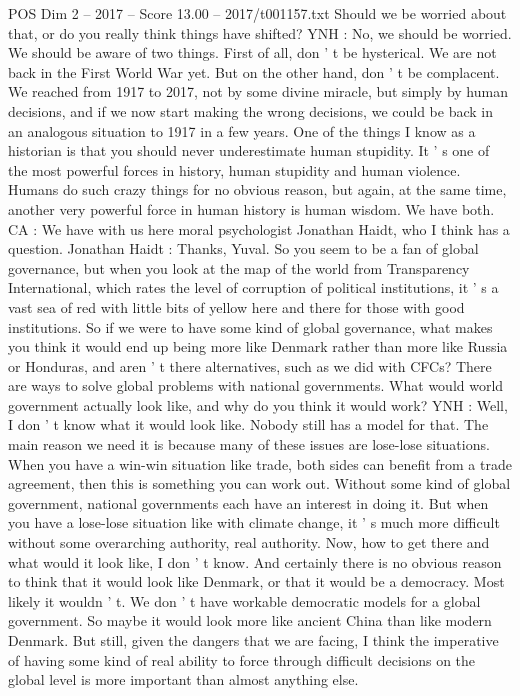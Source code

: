 \begin{textsample}{POS Dim 2 – 2017 – Score 13.00 – 2017/t001157.txt}
Should we be worried about that, or do you really think things have shifted?
YNH : No, we should be worried.
We should be aware of two things.
First of all, don ' t be hysterical.
We are not back in the First World War yet.
But on the other hand, don ' t be complacent.
We reached from 1917 to 2017, not by some divine miracle, but simply by human decisions, and if we now start making the wrong decisions, we could be back in an analogous situation to 1917 in a few years.
One of the things I know as a historian is that you should never underestimate human stupidity.
It ' s one of the most powerful forces in history, human stupidity and human violence.
Humans do such crazy things for no obvious reason, but again, at the same time, another very powerful force in human history is human wisdom.
We have both.
CA : We have with us here moral psychologist Jonathan Haidt, who I think has a question.
Jonathan Haidt : Thanks, Yuval.
So you seem to be a fan of global governance, but when you look at the map of the world from Transparency International, which rates the level of corruption of political institutions, it ' s a vast sea of red with little bits of yellow here and there for those with good institutions.
So if we were to have some kind of global governance, what makes you think it would end up being more like Denmark rather than more like Russia or Honduras, and aren ' t there alternatives, such as we did with CFCs?
There are ways to solve global problems with national governments.
What would world government actually look like, and why do you think it would work?
YNH : Well, I don ' t know what it would look like.
Nobody still has a model for that.
The main reason we need it is because many of these issues are lose-lose situations.
When you have a win-win situation like trade, both sides can benefit from a trade agreement, then this is something you can work out.
Without some kind of global government, national governments each have an interest in doing it.
But when you have a lose-lose situation like with climate change, it ' s much more difficult without some overarching authority, real authority.
Now, how to get there and what would it look like, I don ' t know.
And certainly there is no obvious reason to think that it would look like Denmark, or that it would be a democracy.
Most likely it wouldn ' t.
We don ' t have workable democratic models for a global government.
So maybe it would look more like ancient China than like modern Denmark.
But still, given the dangers that we are facing, I think the imperative of having some kind of real ability to force through difficult decisions on the global level is more important than almost anything else.

\end{textsample}
